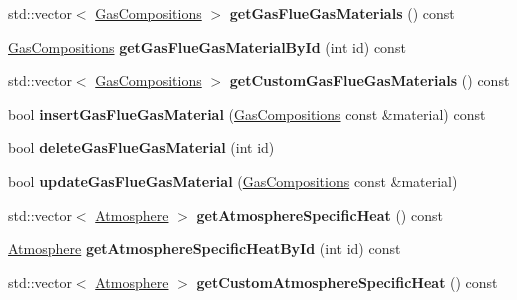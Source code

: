 \begin{DoxyCompactItemize}
std\+::vector$<$ \hyperlink{class_gas_compositions}{Gas\+Compositions} $>$ {\bfseries get\+Gas\+Flue\+Gas\+Materials} () const
\item 
\mbox{\label{class_s_q_lite_a230049a94b9e2ff84d19fcd5a087954c}} 
\hyperlink{class_gas_compositions}{Gas\+Compositions} {\bfseries get\+Gas\+Flue\+Gas\+Material\+By\+Id} (int id) const
\item 
\mbox{\label{class_s_q_lite_a702e2e50ec461d7d47ef33990a1c353e}} 
std\+::vector$<$ \hyperlink{class_gas_compositions}{Gas\+Compositions} $>$ {\bfseries get\+Custom\+Gas\+Flue\+Gas\+Materials} () const
\item 
\mbox{\label{class_s_q_lite_a95d5521ed0de19c979ac9627ae21fbcd}} 
bool {\bfseries insert\+Gas\+Flue\+Gas\+Material} (\hyperlink{class_gas_compositions}{Gas\+Compositions} const \&material) const
\item 
\mbox{\label{class_s_q_lite_a12b38db00e6d8bcff8345e7300a67b26}} 
bool {\bfseries delete\+Gas\+Flue\+Gas\+Material} (int id)
\item 
\mbox{\label{class_s_q_lite_a71c1973e285ccae25b7bb8dbc101770e}} 
bool {\bfseries update\+Gas\+Flue\+Gas\+Material} (\hyperlink{class_gas_compositions}{Gas\+Compositions} const \&material)
\item 
\mbox{\label{class_s_q_lite_ab3519768b6490be3ea5c57df3a4ad3a4}} 
std\+::vector$<$ \hyperlink{class_atmosphere}{Atmosphere} $>$ {\bfseries get\+Atmosphere\+Specific\+Heat} () const
\item 
\mbox{\label{class_s_q_lite_ae468835cffed182bb9819299463c53b7}} 
\hyperlink{class_atmosphere}{Atmosphere} {\bfseries get\+Atmosphere\+Specific\+Heat\+By\+Id} (int id) const
\item 
\mbox{\label{class_s_q_lite_a93535b59e35ada6a194601e36c0055f1}} 
std\+::vector$<$ \hyperlink{class_atmosphere}{Atmosphere} $>$ {\bfseries get\+Custom\+Atmosphere\+Specific\+Heat} () const
\item 
\mbox{\label{class_s_q_lite_a5be90371486d63abd80668c19682051b}} 

\end{DoxyCompactItemize}
